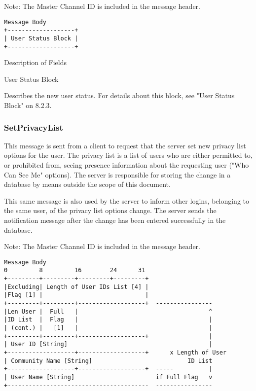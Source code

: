 \documentclass[titlepage,oneside]{book}
\begin{document}
\par{} Note: The Master Channel ID is included in the message header.

\begin{verbatim}
Message Body
+-------------------+
| User Status Block |
+-------------------+
\end{verbatim}

\par{} Description of Fields

\par{} User Status Block

\subpar{}  Describes the new user status. For details about this block, see
  "User Status Block" on 8.2.3.

\subsubsection{SetPrivacyList}

\par{} This message is sent from a client to request that the server set new
privacy list options for the user. The privacy list is a list of users
who are either permitted to, or prohibited from, seeing presence
information about the requesting user ("Who Can See Me" options). The
server is responsible for storing the change in a database by means
outside the scope of this document.

\par{} This same message is also used by the server to inform other logins,
belonging to the same user, of the privacy list options change. The
server sends the notification message after the change has been
entered successfully in the database.

\par{} Note: The Master Channel ID is included in the message header.

\begin{verbatim}
Message Body
0         8         16        24      31
+---------+---------+---------+---------+
|Excluding| Length of User IDs List [4] |
|Flag [1] |                             |
+---------+---------+-------------------+  ----------------
|Len User |  Full   |                                     ^
|ID List  |  Flag   |                                     |
| (cont.) |   [1]   |                                     |
+---------+---------+-------------------+                 |
| User ID [String]                                        |
+-------------------+-------------------+      x Length of User
| Community Name [String]                           ID List
+-------------------+-------------------+  -----          |
| User Name [String]                       if Full Flag   v
+----------------------------------------  ----------------
\end{verbatim}
\end{document}
